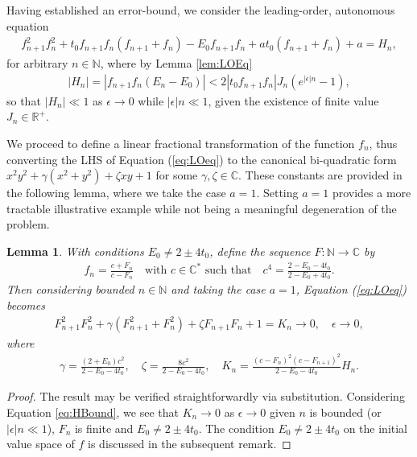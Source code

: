 \documentclass[reqno,a4paper]{amsart}
\numberwithin{equation}{section}
\theoremstyle{plain}
\newtheorem{lemma}[theorem]{Lemma}
\theoremstyle{remark}
\begin{document}
Having established an error-bound, we consider the leading-order, autonomous equation
\begin{align}\label{eq:LOeq}
    f_{n+1}^2f_n^2+t_0f_{n+1}f_n(f_{n+1}+f_n)-E_0f_{n+1}f_n+at_0(f_{n+1}+f_{n})+a=H_n,
\end{align}
for arbitrary $n\in\mathbb{N}$, where by Lemma \ref{lem:LOEq}
\begin{align}\label{eq:HBound}
    |H_n|=|f_{n+1}f_n(E_n-E_0)|<2\left|t_0f_{n+1}f_n\right|J_n\left(e^{|\epsilon|n}-1\right),
\end{align}
so that $|H_n|\ll1$ as $\epsilon\to0$ while $|\epsilon|n\ll1$, given the existence of finite value $J_n\in\mathbb{R}^+$.

We proceed to define a linear fractional transformation of the function $f_n$, thus converting the LHS of Equation (\ref{eq:LOeq}) to the canonical bi-quadratic form $x^2y^2+\gamma(x^2+y^2)+\zeta xy+1$ for some $\gamma,\zeta\in\mathbb{C}$. These constants are provided in the following lemma, where we take the case $a=1$. Setting $a=1$ provides a more tractable illustrative example while not being a meaningful degeneration of the problem.
\begin{lemma}\label{lem:cononForm}
    With conditions $E_0\neq 2\pm4t_0$, define the sequence $F:\mathbb{N}\rightarrow\mathbb{C}$ by
    \begin{align*}
        f_n=\frac{c+F_n}{c-F_n}\quad\text{with $c\in\mathbb{C}^*$ such that}\quad c^4=\frac{2-E_0-4t_0}{2-E_0+4t_0}.
    \end{align*}
    Then considering bounded $n\in\mathbb{N}$ and taking the case $a=1$, Equation (\ref{eq:LOeq}) becomes
    \begin{align*}
        F_{n+1}^2F_{n}^2+\gamma\left(F_{n+1}^2+F_{n}^2\right)+\zeta F_{n+1}F_n+1=K_n\to0,\quad\epsilon\to0,
    \end{align*}
    where
    \begin{align*}
        \gamma=\frac{(2+E_0)c^2}{2-E_0-4t_0},\quad\zeta=\frac{8c^2}{2-E_0-4t_0},\quad K_n=\frac{(c-F_n)^2(c-F_{n+1})^2}{2-E_0-4t_0}H_n.
    \end{align*}
\end{lemma}
\begin{proof}
    The result may be verified straightforwardly via substitution. Considering Equation \eqref{eq:HBound}, we see that $K_n\to0$ as $\epsilon\to0$ given $n$ is bounded (or $|\epsilon|n\ll1$), $F_n$ is finite and $E_0\neq 2\pm4t_0$. The condition $E_0\neq 2\pm4t_0$ on the initial value space of $f$ is discussed in the subsequent remark.
\end{proof}
\end{document}
